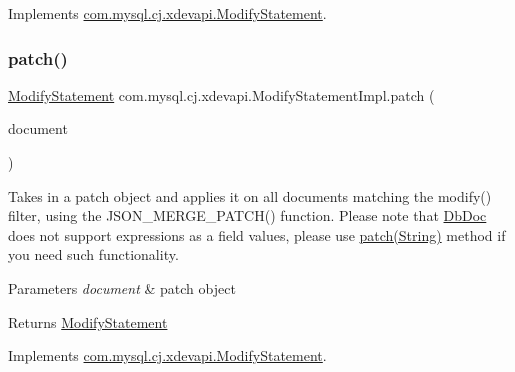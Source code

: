 Implements \mbox{\hyperlink{interfacecom_1_1mysql_1_1cj_1_1xdevapi_1_1_modify_statement_a479a30f18124563becbdb944587a35a1}{com.\+mysql.\+cj.\+xdevapi.\+Modify\+Statement}}.

\mbox{\label{classcom_1_1mysql_1_1cj_1_1xdevapi_1_1_modify_statement_impl_a685044daafc9ed7a37d743ac62db9465}} 
\subsubsection{\texorpdfstring{patch()}{patch()}\hspace{0.1cm}{\footnotesize\ttfamily [1/2]}}
{\footnotesize\ttfamily \mbox{\hyperlink{interfacecom_1_1mysql_1_1cj_1_1xdevapi_1_1_modify_statement}{Modify\+Statement}} com.\+mysql.\+cj.\+xdevapi.\+Modify\+Statement\+Impl.\+patch (\begin{DoxyParamCaption}\item[{\mbox{\hyperlink{interfacecom_1_1mysql_1_1cj_1_1xdevapi_1_1_db_doc}{Db\+Doc}}}]{document }\end{DoxyParamCaption})}

Takes in a patch object and applies it on all documents matching the modify() filter, using the J\+S\+O\+N\+\_\+\+M\+E\+R\+G\+E\+\_\+\+P\+A\+T\+C\+H() function. Please note that \mbox{\hyperlink{interfacecom_1_1mysql_1_1cj_1_1xdevapi_1_1_db_doc}{Db\+Doc}} does not support expressions as a field values, please use \mbox{\hyperlink{classcom_1_1mysql_1_1cj_1_1xdevapi_1_1_modify_statement_impl_a67bbbca2a519b79e54c1957e4d2f7c92}{patch(\+String)}} method if you need such functionality.


\begin{DoxyParams}{Parameters}
{\em document} & patch object \\
\hline
\end{DoxyParams}
\begin{DoxyReturn}{Returns}
\mbox{\hyperlink{interfacecom_1_1mysql_1_1cj_1_1xdevapi_1_1_modify_statement}{Modify\+Statement}} 
\end{DoxyReturn}


Implements \mbox{\hyperlink{interfacecom_1_1mysql_1_1cj_1_1xdevapi_1_1_modify_statement_adb4e6de8bc815f50dc9ee5241454786c}{com.\+mysql.\+cj.\+xdevapi.\+Modify\+Statement}}.

